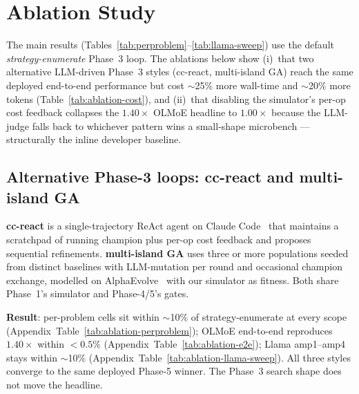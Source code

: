 \section{Ablation Study}
\label{sec:ablation}

The main results (Tables~\ref{tab:perproblem}--\ref{tab:llama-sweep})
use the default \emph{strategy-enumerate} Phase~3 loop. The
ablations below show (i)~that two alternative LLM-driven Phase~3
styles (cc-react, multi-island GA) reach the same deployed
end-to-end performance but cost $\sim$25\% more wall-time and
$\sim$20\% more tokens (Table~\ref{tab:ablation-cost}), and
(ii)~that disabling the simulator's per-op cost feedback collapses
the $1.40\times$ OLMoE headline to $1.00\times$ because the
LLM-judge falls back to whichever pattern wins a small-shape
microbench --- structurally the inline developer baseline.

\subsection{Alternative Phase-3 loops: cc-react and multi-island GA}
\label{sec:ablation-styles}

\textbf{cc-react} is a single-trajectory ReAct agent on Claude
Code~\cite{anthropic_claude_code} that maintains a scratchpad of
running champion plus per-op cost feedback and proposes
sequential refinements. \textbf{multi-island GA} uses three or
more populations seeded from distinct baselines with LLM-mutation
per round and occasional champion exchange, modelled on
AlphaEvolve~\cite{novikov2025alphaevolve} with our simulator as
fitness. Both share Phase~1's simulator and Phase-4/5's gates.

\textbf{Result}: per-problem cells sit within $\sim$10\% of
strategy-enumerate at every scope
(Appendix~Table~\ref{tab:ablation-perproblem}); OLMoE end-to-end
reproduces $\mathbf{1.40\times}$ within $<0.5\%$
(Appendix~Table~\ref{tab:ablation-e2e}); Llama amp1--amp4 stays
within $\sim$10\% (Appendix~Table~\ref{tab:ablation-llama-sweep}). All three
styles converge to the same deployed Phase-5 winner. The Phase~3
search shape does not move the headline.


